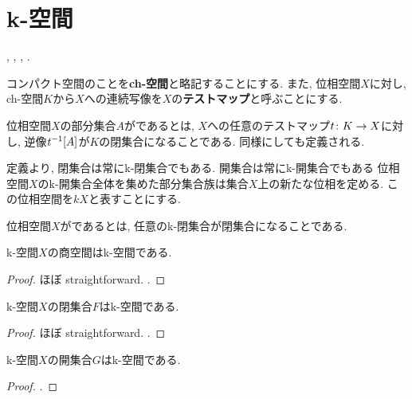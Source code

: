\documentclass[uplatex, dvipdfmx, a4paper, 12pt, class=jsbook, crop=false]{standalone}
\begin{document}
\section{k-空間}
\label{sec:k-spaces}

\begin{source}
	\cite[Section 7.9]{Dieck2008AT},
	\cite{Strickland2009CGWH},
	\cite{Rezk2017CGS},
	\cite{Rezk0000K}.
\end{source}

コンパクト\Hausdorff 空間のことを\textbf{ch-空間}と略記することにする.
また, 位相空間$X$に対し, ch-空間$K$から$X$への連続写像を$X$の\textbf{テストマップ}と呼ぶことにする.

\begin{definition}
	位相空間$X$の部分集合$A$がであるとは,
	$X$への任意のテストマップ$t\colon K\to X$に対し,
	逆像$\mapinvset{t}{A}$が$K$の閉集合になることである.
	同様にしても定義される.
\end{definition}

定義より, 閉集合は常にk-閉集合でもある.
開集合は常にk-開集合でもある
位相空間$X$のk-開集合全体を集めた部分集合族は集合$X$上の新たな位相を定める.
この位相空間を$kX$と表すことにする.

\begin{definition}
	位相空間$X$がであるとは,
	任意のk-閉集合が閉集合になることである.
\end{definition}

\begin{proposition}
	k-空間$X$の商空間はk-空間である.
\end{proposition}

\begin{proof}
	ほぼ straightforward.
	\WIP.
\end{proof}

\begin{proposition}
	k-空間$X$の閉集合$F$はk-空間である.
\end{proposition}

\begin{proof}
	ほぼ straightforward.
	\WIP.
\end{proof}

\begin{proposition}
	k-空間$X$の開集合$G$はk-空間である.
\end{proposition}

\begin{proof}
	\WIP.
\end{proof}
\end{document}
